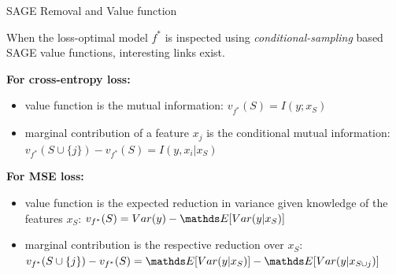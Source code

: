 \documentclass[11pt,compress,t,notes=noshow, aspectratio=169, xcolor=table]{beamer}
\begin{document}
\begin{frame}{SAGE Removal and Value function}

When the loss-optimal model $f^*$ is inspected using \textit{conditional-sampling} based SAGE value functions, interesting links exist.

\lz\pause
\textbf{For cross-entropy loss:} 
  \begin{itemize}
      \item value function is the mutual information:  $v_{f^*}(S) = I(y;x_S)$
      \item marginal contribution of a feature $x_j$ is the conditional mutual information: $v_{f^*}(S \cup \{j\}) - v_{f^*}(S) = I(y,x_i|x_S)$
  \end{itemize}

\lz\pause

\textbf{For MSE loss:} 
    \begin{itemize}
    \item value function is the expected reduction in variance given knowledge of the features $x_S$: $v_{f^*}(S) = Var(y) - \E[Var(y|x_S)]$
    \item marginal contribution is the respective reduction over $x_S$:
    $v_{f^*}(S \cup \{j\}) - v_{f^*}(S) = \E[Var(y|x_S)] - \E[Var(y|x_{S \cup {j}})]$
    \end{itemize}
    
\end{frame}
\end{document}
